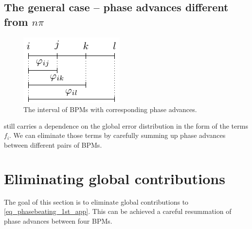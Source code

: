 \subsection{The general case -- phase advances different from \texorpdfstring{$n\pi$}{n*pi}}
\label{sec_generalcase}
%
\begin{figure}[htbp]
  \centering
    \includegraphics[width=.3\linewidth]{figIntervPhiIj}
  \caption{The interval of BPMs with corresponding phase advances.}
  \label{fig_interv_phi_ij}
\end{figure}
%
 still carries a dependence on the global error distribution in the form
of the terms $f_i$. We can eliminate those terms by carefully summing up phase advances between
different pairs of BPMs.


\section{Eliminating global contributions}
\label{sec_resummation}
The goal of this section is to eliminate global contributions to \eqref{eq_phasebeating_1st_app}.
This can be achieved a careful resummation of phase advances between four BPMs.


